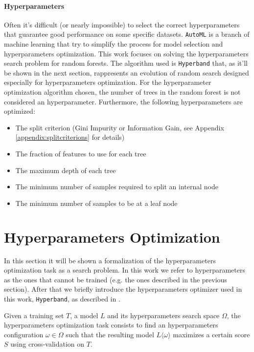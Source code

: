 \documentclass[11pt, a4paper]{article}
\begin{document}
  \paragraph{Hyperparameters}
    Often it's difficult (or nearly impossible) to select the correct hyperparameters that guarantee good performance on some specific datasets.
    \texttt{AutoML} is a branch of machine learning that try to simplify the process for model selection and hyperparameters optimization.
    This work focuses on solving the hyperparameters search problem for random forests.
    The algorithm used is \texttt{Hyperband} that, as it'll be shown in the next section, rappresents an evolution of random search designed especially for hyperparameters optimization.
    For the hyperparameter optimization algorithm chosen, the number of trees in the random forest is not considered an hyperparameter.
    Furthermore, the following hyperparameters are optimized:
    \begin{itemize}
      \item The split criterion (Gini Impurity or Information Gain, see Appendix \ref{appendix:splitcriterions} for details)
      \item The fraction of features to use for each tree
      \item The maximum depth of each tree
      \item The minimum number of samples required to split an internal node
      \item The minimum number of samples to be at a leaf node
    \end{itemize}

\section{Hyperparameters Optimization}
  In this section it will be shown a formalization of the hyperparameters optimization task as a search problem.
  In this work we refer to hyperparameters as the ones that cannot be trained (e.g. the ones described in the previous section).
  After that we briefly introduce the hyperparameters optimizer used in this work, \texttt{Hyperband}, as described in \cite{hyperband}.

  Given a training set $T$, a model $L$ and its hyperparameters search space $\Omega$, the hyperparameters optimization task consists to find an hyperparameters configuration $\omega \in \Omega$ such that the resulting model $L\langle\omega\rangle$ maximizes a certain score $S$ using cross-validation on $T$.
\end{document}
